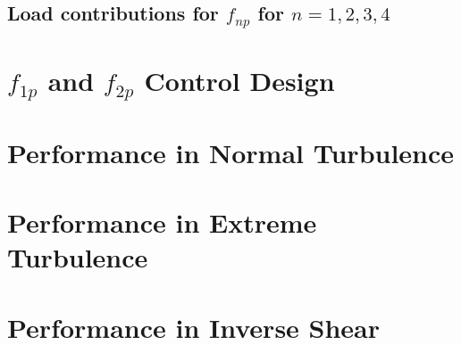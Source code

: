\subsection{Load contributions for $f_{np}$ for $n=1,2,3,4$}




\section{$f_{1p}$ and $f_{2p}$ Control Design}

\section{Performance in Normal Turbulence}

\section{Performance in Extreme Turbulence}

\section{Performance in Inverse Shear}







